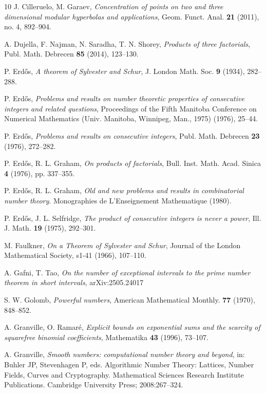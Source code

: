\documentclass[12pt]{amsart}
\begin{document}
\begin{thebibliography}{10}
J. Cilleruelo, M. Garaev, \emph{Concentration of points on two and three dimensional modular hyperbolas and applications}, Geom. Funct. Anal. \textbf{21} (2011), no. 4, 892--904.

A. Dujella, F. Najman, N. Saradha, T. N. Shorey, \emph{Products of three factorials}, Publ. Math. Debrecen \textbf{85} (2014), 123--130.

P. Erd\H{o}s, \emph{A theorem of Sylvester and Schur}, J. London Math. Soc. \textbf{9} (1934), 282--288.

P. Erd\H{o}s, \emph{Problems and results on number theoretic properties of consecutive integers and related questions}, Proceedings of the Fifth Manitoba Conference on Numerical Mathematics (Univ. Manitoba, Winnipeg, Man., 1975) (1976), 25--44.

P. Erd\H{o}s, \emph{Problems and results on consecutive integers}, Publ. Math. Debrecen \textbf{23} (1976), 272--282.

P. Erd\H{o}s, R. L. Graham, \emph{On products of factorials}, Bull. Inst. Math. Acad. Sinica \textbf{4} (1976), pp. 337--355.

P. Erd\H{o}s, R. L. Graham, \emph{Old and new problems and results in combinatorial number theory}. Monographies de L'Enseignement Mathematique (1980).

P. Erd\H{o}s, J. L. Selfridge, \emph{The product of consecutive integers is never a power}, Ill. J. Math. \textbf{19} (1975), 292--301.

M. Faulkner, \emph{On a Theorem of Sylvester and Schur}, Journal of the London Mathematical Society, s1-41 (1966), 107--110.

A. Gafni, T. Tao, \emph{On the number of exceptional intervals to the prime number theorem in short intervals}, arXiv:2505.24017

S. W. Golomb, \emph{Powerful numbers}, American Mathematical Monthly. \textbf{77} (1970), 848--852.

A. Granville, O. Ramar\'e, \emph{Explicit bounds on exponential sums and the scarcity of squarefree binomial coefficients}, Mathematika \textbf{43} (1996), 73--107.

A. Granville, \emph{Smooth numbers: computational number theory and beyond}, in: Buhler JP, Stevenhagen P, eds. Algorithmic Number Theory: Lattices, Number Fields, Curves and Cryptography. Mathematical Sciences Research Institute Publications. Cambridge University Press; 2008:267--324.


\end{thebibliography}
\end{document}
